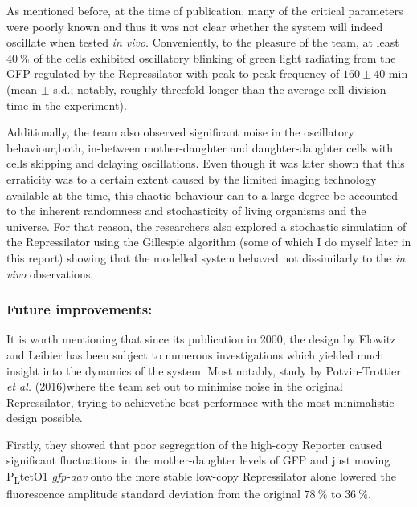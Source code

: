\documentclass[runningheads,a4paper]{llncs}
\begin{document}
As mentioned before, at the time of publication, many of the critical parameters were poorly known and thus it was not clear whether the system will indeed oscillate when tested \textit{in vivo}. Conveniently, to the pleasure of the team, at least $40\ \%$ of the cells exhibited oscillatory blinking of green light radiating from the GFP regulated by the Repressilator with peak-to-peak frequency of $160 \pm 40$ min (mean $\pm$ s.d.; notably, roughly threefold longer than the average cell-division time in the experiment)\cite{Elowitz2000d}. 

Additionally, the team also observed significant noise in the oscillatory behaviour,\linebreak both, in-between mother-daughter and daughter-daughter cells with cells skipping and delaying oscillations\cite{Elowitz2000d}. Even though it was later shown that this erraticity was to a certain extent caused by the limited imaging technology available at the time\cite{Potvin-Trottier2016a}, this chaotic behaviour can to a large degree be accounted to the inherent randomness and stochasticity of living organisms and the universe. For that reason, the researchers also explored a stochastic simulation of the Repressilator using the Gillespie algorithm (some of which I do myself later in this report) showing that the modelled system behaved not dissimilarly to the \textit{in vivo} observations\cite{Elowitz2000d}.

\subsubsection*{Future improvements:}
It is worth mentioning that since its publication in 2000, the design by Elowitz and Leibier has been subject to numerous investigations which yielded much insight into the dynamics of the system\cite{Purcell2010a}. Most notably, study by Potvin-Trottier \textit{et al.} (2016)\cite{Potvin-Trottier2016a}\linebreak where the team set out to minimise noise in the original Repressilator, trying to achieve\linebreak the best performace with the most minimalistic design possible.

Firstly, they showed that poor segregation of the high-copy Reporter caused significant fluctuations in the mother-daughter levels of GFP and just moving P\textsubscript{L}tetO1 \textit{gfp-aav} onto the more stable low-copy Repressilator alone lowered the fluorescence amplitude standard deviation from the original $78\ \%$ to $36\ \%$\cite{Potvin-Trottier2016a}. 
\end{document}
